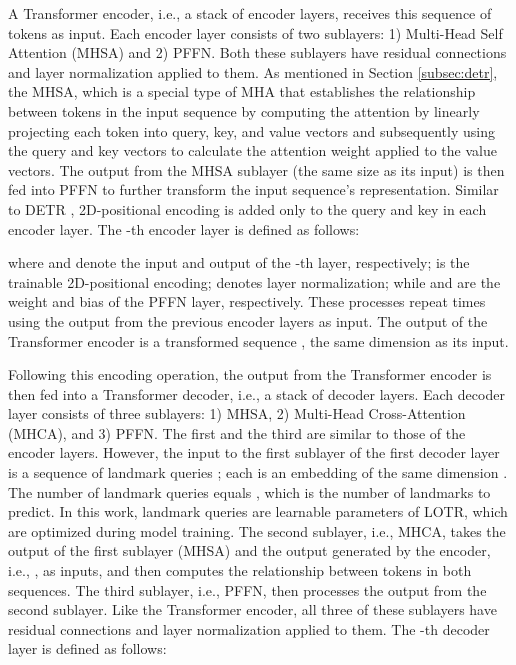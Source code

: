 \documentclass[journal]{IEEEtran}
\begin{document}
A Transformer encoder, i.e., a stack of  encoder layers, receives this sequence of tokens as input.
Each encoder layer consists of two sublayers: 1) Multi-Head Self Attention (MHSA) and 2) PFFN.
Both these sublayers have residual connections and layer normalization applied to them.
As mentioned in Section \ref{subsec:detr}, the MHSA, which is a special type of MHA that establishes the relationship between tokens in the input sequence by computing the attention by linearly projecting each token into query, key, and value vectors and subsequently using the query and key vectors to calculate the attention weight applied to the value vectors. 
The output from the MHSA sublayer (the same size as its input) is then fed into PFFN to further transform the input sequence's representation. 
Similar to DETR \cite{Carion2020}, 2D-positional encoding is added only to the query and key in each encoder layer. 
The -th encoder layer is defined as follows:





where  and  denote the input and output of the -th layer, respectively;  is the trainable 2D-positional encoding;  denotes layer normalization; while  and  are the weight and bias of the PFFN layer, respectively.
These processes repeat  times using the output from the previous encoder layers as input. 
The output of the Transformer encoder is a transformed sequence , the same dimension as its input.

Following this encoding operation, the output from the Transformer encoder is then fed into a Transformer decoder, i.e., a stack of  decoder layers. 
Each decoder layer consists of three sublayers: 1) MHSA, 2) Multi-Head Cross-Attention (MHCA), and 3) PFFN. 
The first and the third are similar to those of the encoder layers. 
However, the input to the first sublayer of the first decoder layer is a sequence of landmark queries ; each is an embedding of the same dimension . 
The number of landmark queries equals , which is the number of landmarks to predict. 
In this work, landmark queries are learnable parameters of LOTR, which are optimized during model training. 
The second sublayer, i.e., MHCA, takes the output of the first sublayer (MHSA) and the output generated by the encoder, i.e., , as inputs, and then computes the relationship between tokens in both sequences. 
The third sublayer, i.e., PFFN, then processes the output from the second sublayer.
Like the Transformer encoder, all three of these sublayers have residual connections and layer normalization applied to them. 
The -th decoder layer is defined as follows:
\end{document}
